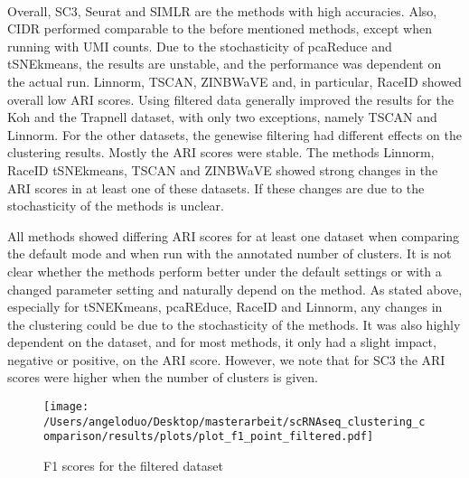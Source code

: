 \documentclass[12pt, a4paper]{article}\usepackage[]{graphicx}\usepackage[]{color}
\begin{document}
\paragraph{}

Overall, SC3, Seurat and SIMLR are the methods with high accuracies. Also, CIDR performed comparable to the before mentioned methods, except when running with UMI counts. Due to the stochasticity of pcaReduce and tSNEkmeans, the results are unstable, and the performance was dependent on the actual run. Linnorm, TSCAN, ZINBWaVE and, in particular, RaceID showed overall low ARI scores. 
Using filtered data generally improved the results for the Koh and the Trapnell dataset, with only two exceptions, namely TSCAN and Linnorm.
For the other datasets, the genewise filtering had different effects on the clustering results. Mostly the ARI scores were stable. The methods Linnorm, RaceID tSNEkmeans, TSCAN and ZINBWaVE showed strong changes in the ARI scores in at least one of these datasets. If these changes are due to the stochasticity of the methods is unclear.

All methods showed differing ARI scores for at least one dataset when comparing the default mode and when run with the annotated number of clusters. It is not clear whether the methods perform better under the default settings or with a changed parameter setting and naturally depend on the method. As stated above, especially for tSNEKmeans, pcaREduce, RaceID and Linnorm, any changes in the clustering could be due to the stochasticity of the methods. It was also highly dependent on the dataset, and for most methods, it only had a slight impact, negative or positive, on the ARI score. However, we note that for SC3 the ARI scores were higher when the number of clusters is given.

\begin{figure}[!h]
\centering
\texttt{[image: /Users/angeloduo/Desktop/masterarbeit/scRNAseq\_clustering\_comparison/results/plots/plot\_f1\_point\_filtered.pdf]}
\caption{F1 scores for the filtered  dataset }
\label{fig:f1pointplot}
\end{figure}

\newpage
\end{document}
